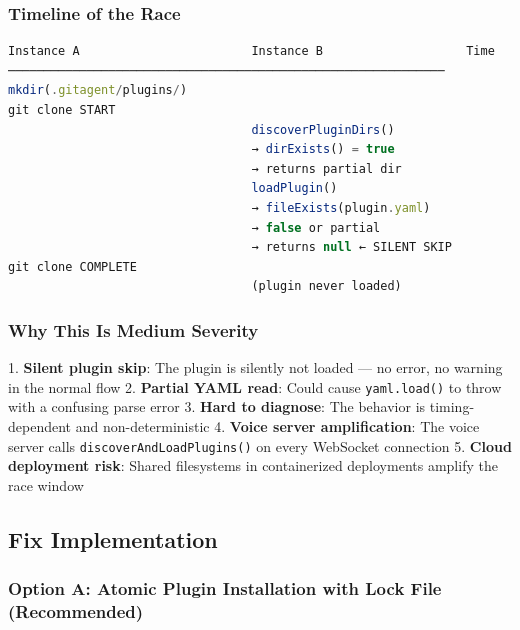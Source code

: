 \subsubsection*{Timeline of the Race}



\begin{lstlisting}[language=TypeScript]
Instance A                        Instance B                    Time
─────────────────────────────────────────────────────────────
mkdir(.gitagent/plugins/)
git clone START
                                  discoverPluginDirs()
                                  → dirExists() = true
                                  → returns partial dir
                                  loadPlugin()
                                  → fileExists(plugin.yaml)
                                  → false or partial
                                  → returns null ← SILENT SKIP
git clone COMPLETE
                                  (plugin never loaded)

\end{lstlisting}



\subsubsection*{Why This Is Medium Severity}

1. \textbf{Silent plugin skip}: The plugin is silently not loaded — no error, no warning in the normal flow
2. \textbf{Partial YAML read}: Could cause \texttt{yaml.load()} to throw with a confusing parse error
3. \textbf{Hard to diagnose}: The behavior is timing-dependent and non-deterministic
4. \textbf{Voice server amplification}: The voice server calls \texttt{discoverAndLoadPlugins()} on every WebSocket connection
5. \textbf{Cloud deployment risk}: Shared filesystems in containerized deployments amplify the race window


\subsection*{Fix Implementation}
\subsubsection*{Option A: Atomic Plugin Installation with Lock File (Recommended)}



